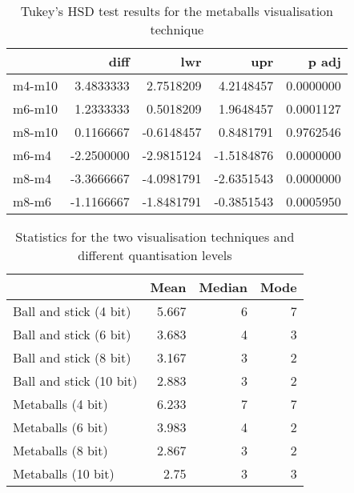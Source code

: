 \begin{table}
  \begin{tabular}{ | l | r | r | r | r |}
  \hline
         &       diff &        lwr &        upr &     p adj  \\ \hline
  m4-m10 &  3.4833333 &  2.7518209 &  4.2148457 & 0.0000000  \\ \hline
  m6-m10 &  1.2333333 &  0.5018209 &  1.9648457 & 0.0001127  \\ \hline
  m8-m10 &  0.1166667 & -0.6148457 &  0.8481791 & 0.9762546  \\ \hline
  m6-m4  & -2.2500000 & -2.9815124 & -1.5184876 & 0.0000000  \\ \hline
  m8-m4  & -3.3666667 & -4.0981791 & -2.6351543 & 0.0000000  \\ \hline
  m8-m6  & -1.1166667 & -1.8481791 & -0.3851543 & 0.0005950  \\ \hline
  \end{tabular}
  \caption{Tukey's HSD test results for the metaballs visualisation technique}
  \label{tab:appendix_metaballs_tukeyhsd}
\end{table}


\begin{table}
  \begin{tabular}{ | l | r | r | r | }
  \hline
                          &  Mean & Median & Mode  \\ \hline
  Ball and stick (4 bit)  & 5.667 &      6 &    7  \\ \hline
  Ball and stick (6 bit)  & 3.683 &      4 &    3  \\ \hline
  Ball and stick (8 bit)  & 3.167 &      3 &    2  \\ \hline
  Ball and stick (10 bit) & 2.883 &      3 &    2  \\ \hline
  Metaballs (4 bit)       & 6.233 &      7 &    7  \\ \hline
  Metaballs (6 bit)       & 3.983 &      4 &    2  \\ \hline
  Metaballs (8 bit)       & 2.867 &      3 &    2  \\ \hline
  Metaballs (10 bit)      &  2.75 &      3 &    3  \\ \hline
  \end{tabular}
  \caption{Statistics for the two visualisation techniques and different
  quantisation levels}
  \label{tab:appendix_experiment_statistics}
\end{table}




